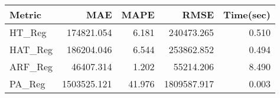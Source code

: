 \begin{tabular}{lrrrr}
\toprule
Metric &          MAE &    MAPE &         RMSE &  Time(sec) \\
\midrule
HT\_Reg  &   174821.054 &   6.181 &   240473.265 &      0.510 \\
HAT\_Reg &   186204.046 &   6.544 &   253862.852 &      0.494 \\
ARF\_Reg &    46407.314 &   1.202 &    55214.206 &      8.490 \\
PA\_Reg  &  1503525.121 &  41.976 &  1809587.917 &      0.003 \\
\bottomrule
\end{tabular}
